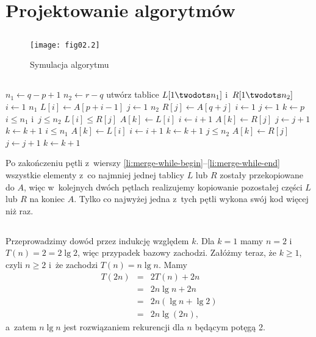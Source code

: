 \section{Projektowanie algorytmów}

\subsection{} %
\begin{figure}[h]
	\begin{center}
		\texttt{[image: fig02.2]}
	\end{center}
	\caption{Symulacja algorytmu }
\end{figure}

\subsection{} %
\begin{codebox}
\li	$n_1\gets q-p+1$
\li	$n_2\gets r-q$
\li	utwórz tablice $L[1\twodots n_1]$ i~$R[1\twodots n_2]$
\li	\For $i\gets1$ \To $n_1$
\li		\Do
			$L[i]\gets A[p+i-1]$
		\End
\li	\For $j\gets1$ \To $n_2$
\li		\Do
			$R[j]\gets A[q+j]$
		\End
\li	$i\gets1$
\li	$j\gets1$
\li	$k\gets p$
\li	\While $i\le n_1$ i~$j\le n_2$ \label{li:merge-while-begin}
\li		\Do
			\If $L[i]\le R[j]$
\li				\Then
					$A[k]\gets L[i]$
\li					$i\gets i+1$
\li				\Else
					$A[k]\gets R[j]$
\li					$j\gets j+1$
				\End
\li			$k\gets k+1$
		\End \label{li:merge-while-end}
\li	\While $i\le n_1$
\li		\Do
			$A[k]\gets L[i]$
\li			$i\gets i+1$
\li			$k\gets k+1$
		\End
\li	\While $j\le n_2$
\li		\Do
			$A[k]\gets R[j]$
\li			$j\gets j+1$
\li			$k\gets k+1$
		\End
\end{codebox}
Po zakończeniu pętli  z~wierszy \ref{li:merge-while-begin}--\ref{li:merge-while-end} wszystkie elementy z~co najmniej jednej tablicy $L$ lub $R$ zostały przekopiowane do $A$, więc w~kolejnych dwóch pętlach  realizujemy kopiowanie pozostałej części $L$ lub $R$ na koniec $A$. Tylko co najwyżej jedna z~tych pętli wykona swój kod więcej niż raz.

\subsection{} %
Przeprowadzimy dowód przez indukcję względem $k$. Dla $k=1$ mamy $n=2$ i~$T(n)=2=2\lg2$, więc przypadek bazowy zachodzi. Załóżmy teraz, że $k\ge1$, czyli $n\ge2$ i~że zachodzi $T(n)=n\lg n$. Mamy
\begin{eqnarray*}
	T(2n) &=& 2T(n)+2n \\
	&=& 2n\lg n+2n \\
	&=& 2n(\lg n+\lg 2) \\
	&=& 2n\lg(2n),
\end{eqnarray*}
a~zatem $n\lg n$ jest rozwiązaniem rekurencji dla $n$ będącym potęgą 2.


